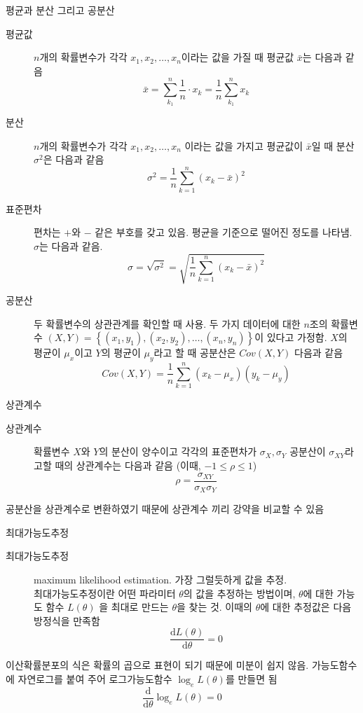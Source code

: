\documentclass[10pt,t]{beamer}
\begin{document}
\begin{frame} {평균과 분산 그리고 공분산}
    \begin{description}
        \item[평균값] $n$개의 확률변수가 각각 $x_1, x_2, \ldots, x_n$이라는 값을 가질 때 평균값 $\bar{x}$는 다음과 같음 \[\bar{x}= \sum_{k_1}^n \frac{1}{n} \cdot x_k = \frac{1}{n}\sum _{k_1}^{n} x_k\]
        \item[분산] $n$개의 확률변수가 각각 $x_1, x_2, \ldots, x_n$ 이라는 값을 가지고 평균값이 $\bar{x}$일 때 분산 $\sigma^2$은 다음과 같음 \[\sigma^2 = \frac{1}{n}\sum_{k=1}^{n} (x_k-\bar{x})^2\]
        \item[표준편차] 편차는 $+$와 $-$ 같은 부호를 갖고 있음. 평균을 기준으로 떨어진 정도를 나타냄. $\sigma$는 다음과 같음. \[\sigma = \sqrt{\sigma^2} = \sqrt{\frac{1}{n}\sum_{k=1}^{n} (x_k-\bar{x})^2}\] 
    \end{description}
    \pagebreak

    \begin{description}
            \item[공분산] 두 확률변수의 상관관계를 확인할 때 사용. 두 가지 데이터에 대한 $n$조의 확률변수 $(X, Y) = \left\{ (x_1, y_1),  (x_2, y_2), \ldots,  (x_n, y_n) \right\}$이 있다고 가정함. $X$의 평균이 $\mu_x$이고 $Y$의 평균이 $\mu_y$라고 할 때 공분산은 $Cov(X, Y)$ 다음과 같음 \[Cov(X,Y) = \frac{1}{n}\sum_{k=1}^{n} (x_k - \mu_x)(y_k - \mu_y)\] 
    \end{description}
\end{frame}



\begin{frame}[fragile] {상관계수}
    \begin{description}
        \item[상관계수] 확률변수 $X$와 $Y$의 분산이 양수이고 각각의 표준편차가 $\sigma_X, \sigma_Y$ 공분산이 $\sigma_{XY}$라고할 때의 상관계수는 다음과 같음 (이때, $-1\leq \rho \leq 1$) \[\rho = \frac{\sigma_{XY}}{\sigma_X\sigma_Y}\] 
    \end{description}
    
    공분산을 상관계수로 변환하였기 때문에 상관계수 끼리 강약을 비교할 수 있음
\end{frame}



\begin{frame}[fragile] {최대가능도추정}
    \begin{description}
        \item[최대가능도추정] maximum likelihood estimation. 가장 그럴듯하게 값을 추정.\\
        최대가능도추정이란 어떤 파라미터 $\theta$의 값을 추정하는 방법이며, $\theta$에 대한 가능도 함수 $L(\theta)$ 을 최대로 만드는 $\theta$을 찾는 것. 이때의 $\theta$에 대한 추정값은 다음 방정식을 만족함\[\frac{\text{d}L(\theta)}{\text{d}\theta}= 0\]
    \end{description}

    이산확률분포의 식은 확률의 곱으로 표현이 되기 때문에 미분이 쉽지 않음. 가능도함수에 자연로그를 붙여 주어 로그가능도함수 $\log_e L(\theta)$를 만들면 됨
    \[\frac{\text{d}}{\text{d}\theta}\log_e L(\theta)=0\]
\end{frame}
\end{document}
